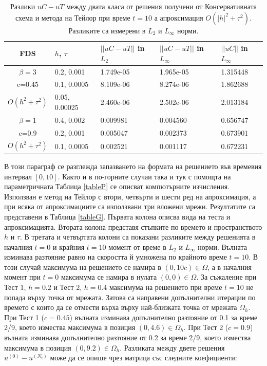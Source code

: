 \documentclass{article}
\begin{document}
\begin{table}[ht]
\centering
\small
		\begin{tabular}{||c|l|l|l|l||}
			\hline
			\hline
      FDS        &$h$, $\tau$  &   $||uC - uT||$  in $L_2$     &  $||uC - uT||$ in $L_\infty$ & $||uC||$ in $L_\infty$ \\
   			\hline 
					\hline 
  $\beta=3$                   &0.2, 0.001         &  1.749e-05      &  1.965e-05  & 1.315448     \\
   c=0.45                        &0.1, 0.0005        &  8.109e-06       & 8.274e-06 &  1.862688     \\
     $O(h^2 + \tau^ 2)$ &0.05, 0.00025     & 2.460e-06         &2.502e-06  &   2.013184   \\
			\hline 
			\hline 
       $\beta=1$          &0.4, 0.002        & 0.009981     & 0.004560 & 0.656747   \\
                  c=0.9      &0.2, 0.001        & 0.005047      & 0.002373  & 0.673901   \\
  $O(h^2+ \tau^2)$ &0.1, 0.0005         & 0.002521      &0.001117 & 0.672231   \\
			\hline
	   \hline
			\hline 
		\end{tabular}
		\caption{Разлики $uC - uT$ между двата класа от решения получени от Консервативната схема и метода на Тейлор при време $t=10$ а апроксимация $O(|h|^2 + \tau^2)$. Разликите са измерени в $L_2$ и $L_\infty$ норми.}
\label{tableF}
\end{table}
\FloatBarrier
В този параграф се разглежда запазването на формата на решението във времевия интервал $[0, 10]$. Както и в по-горните случаи така и тук с помощта на параметричната Таблица \ref{tableP} се описват компютърните изчисления. Използван е метод на Тейлор с втори, четвърти и шести ред на апроксимация, а при всяка от апроксимациите са използвани три вложени мрежи. Резултатите са представени в Таблица \ref{tableG}. Първата колона описва вида на теста и апроксимацията. Втората колона представя стъпките по времето и пространството $h$ и $\tau$. В третата и четвъртата колони са показани разликите между решенията в началния $t=0$ и крайния  $t=10$ момент от време в  $L_2$ и $L_\infty$ норми. Вълната изминава разтояние равно на скоростта й умножена по крайното време $t=10$. В този случай максимума на решението се намира в $(0, 10 c) \in \Omega$, а в началния момент при $t=0$ максимума се намира в нулата $(0, 0) \in \Omega$. За съжаление при Тест 1, $h=0.2$ и Тест 2, $h=0.4$ максимума на решението при време $t=10$ не попада върху точка от мрежата. Затова са направени допълнителни итерации по времето с които да се отмести върха върху най-близката точка от мрежата $\Omega_h$. При Тест 1 ($c=0.45$) вълната изминава допълнително разтояние от 0.1 за време 2/9, което измества максимума в позиция $(0, 4.6) \in \Omega_h$. При Тест 2 ($c=0.9$) вълната изминава допълнително разтояние от 0.2 за време 2/9, което измества максимума в позиция $(0, 9.2) \in \Omega_h$. Разликата между двете решения $u^{(0)} - u^{(N_t)}$ може да се опише чрез матрица със следните коефициенти:
\end{document}
